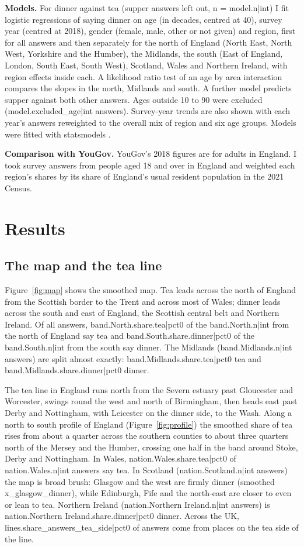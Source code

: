 \documentclass[11pt,a4paper]{article}
\begin{document}
\textbf{Models.} For dinner against tea (supper answers left out, n = {{model.n|int}}) I fit logistic regressions of saying dinner on age (in decades, centred at 40), survey year (centred at 2018), gender (female, male, other or not given) and region, first for all answers and then separately for the north of England (North East, North West, Yorkshire and the Humber), the Midlands, the south (East of England, London, South East, South West), Scotland, Wales and Northern Ireland, with region effects inside each. A likelihood ratio test of an age by area interaction compares the slopes in the north, Midlands and south. A further model predicts supper against both other answers. Ages outside 10 to 90 were excluded ({{model.excluded_age|int}} answers). Survey-year trends are also shown with each year's answers reweighted to the overall mix of region and six age groups. Models were fitted with statsmodels \citep{statsmodels}.

\textbf{Comparison with YouGov.} YouGov's 2018 figures are for adults in England. I took survey answers from people aged 18 and over in England and weighted each region's shares by its share of England's usual resident population in the 2021 Census.

\section{Results}
\subsection{The map and the tea line}
Figure~\ref{fig:map} shows the smoothed map. Tea leads across the north of England from the Scottish border to the Trent and across most of Wales; dinner leads across the south and east of England, the Scottish central belt and Northern Ireland. Of all answers, {{band.North.share.tea|pct0}} of the {{band.North.n|int}} from the north of England say tea and {{band.South.share.dinner|pct0}} of the {{band.South.n|int}} from the south say dinner. The Midlands ({{band.Midlands.n|int}} answers) are split almost exactly: {{band.Midlands.share.tea|pct0}} tea and {{band.Midlands.share.dinner|pct0}} dinner.

The tea line in England runs north from the Severn estuary past Gloucester and Worcester, swings round the west and north of Birmingham, then heads east past Derby and Nottingham, with Leicester on the dinner side, to the Wash. Along a north to south profile of England (Figure~\ref{fig:profile}) the smoothed share of tea rises from about a quarter across the southern counties to about three quarters north of the Mersey and the Humber, crossing one half in the band around Stoke, Derby and Nottingham. In Wales, {{nation.Wales.share.tea|pct0}} of {{nation.Wales.n|int}} answers say tea. In Scotland ({{nation.Scotland.n|int}} answers) the map is broad brush: Glasgow and the west are firmly dinner (smoothed {{x_glasgow_dinner}}), while Edinburgh, Fife and the north-east are closer to even or lean to tea. Northern Ireland ({{nation.Northern Ireland.n|int}} answers) is {{nation.Northern Ireland.share.dinner|pct0}} dinner. Across the UK, {{lines.share_answers_tea_side|pct0}} of answers come from places on the tea side of the line.
\end{document}
